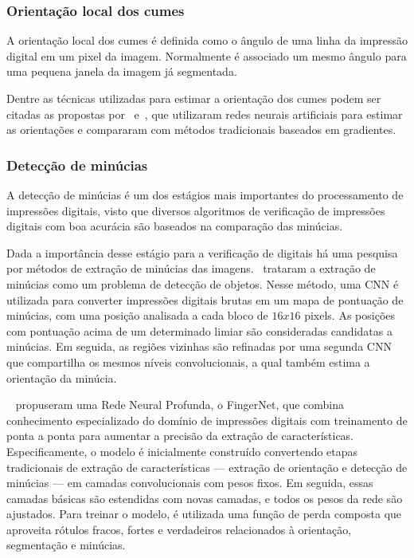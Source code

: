 \subsubsection{Orientação local dos cumes}\label{subsubsec:orientacao}

A orientação local dos cumes é definida como o ângulo de uma linha da impressão digital em um pixel da imagem. Normalmente é associado um mesmo ângulo para uma pequena janela da imagem já segmentada.

Dentre as técnicas utilizadas para estimar a orientação dos cumes podem ser citadas as propostas por~ e~, que utilizaram redes neurais artificiais para estimar as orientações e compararam com métodos tradicionais baseados em gradientes.

\subsubsection{Detecção de minúcias}\label{subsubsec:minucias}

A detecção de minúcias é um dos estágios mais importantes do processamento de impressões digitais, visto que diversos algoritmos de verificação de impressões digitais com boa acurácia são baseados na comparação das minúcias.

Dada a importância desse estágio para a verificação de digitais há uma pesquisa por métodos de extração de minúcias das imagens.~ trataram a extração de minúcias como um problema de detecção de objetos. Nesse método, uma CNN é utilizada para converter impressões digitais brutas em um mapa de pontuação de minúcias, com uma posição analisada a cada bloco de $16x16$ pixels. As posições com pontuação acima de um determinado limiar são consideradas candidatas a minúcias. Em seguida, as regiões vizinhas são refinadas por uma segunda CNN que compartilha os mesmos níveis convolucionais, a qual também estima a orientação da minúcia.

~ propuseram uma Rede Neural Profunda, o FingerNet, que combina conhecimento especializado do domínio de impressões digitais com treinamento de ponta a ponta para aumentar a precisão da extração de características. Especificamente, o modelo é inicialmente construído convertendo etapas tradicionais de extração de características — extração de orientação e detecção de minúcias — em camadas convolucionais com pesos fixos. Em seguida, essas camadas básicas são estendidas com novas camadas, e todos os pesos da rede são ajustados. Para treinar o modelo, é utilizada uma função de perda composta que aproveita rótulos fracos, fortes e verdadeiros relacionados à orientação, segmentação e minúcias.

